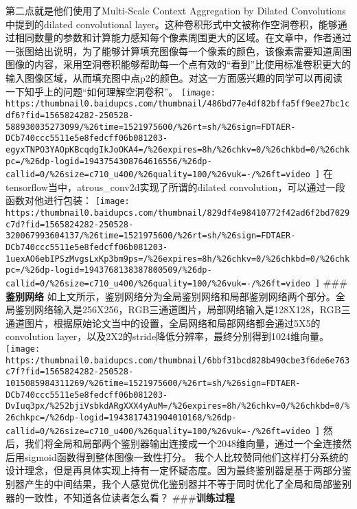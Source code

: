 \documentclass{article}
\begin{document}
第二点就是他们使用了Multi-Scale Context Aggregation by Dilated Convolutions中提到的dilated convolutional layer。这种卷积形式中文被称作空洞卷积，能够通过相同数量的参数和计算能力感知每个像素周围更大的区域。在文章中，作者通过一张图给出说明，为了能够计算填充图像每一个像素的颜色，该像素需要知道周围图像的内容，采用空洞卷积能够帮助每一个点有效的“看到”比使用标准卷积更大的输入图像区域，从而填充图中点p2的颜色。对这一方面感兴趣的同学可以再阅读一下知乎上的问题“如何理解空洞卷积”。
\texttt{[image: https:/thumbnail0.baidupcs.com/thumbnail/486bd77e4df82bffa5ff9ee27bc1cdf6?fid=1565824282-250528-588930035273099/\%26time=1521975600/\%26rt=sh/\%26sign=FDTAER-DCb740ccc5511e5e8fedcff06b081203-egyxTNPO3YAOpKBcqdgIkJoOKA4=/\%26expires=8h/\%26chkv=0/\%26chkbd=0/\%26chkpc=/\%26dp-logid=1943754308764616556/\%26dp-callid=0/\%26size=c710\_u400/\%26quality=100/\%26vuk=-/\%26ft=video
]}{}
在tensorflow当中，atrous\_conv2d实现了所谓的dilated convolution，可以通过一段函数对他进行包装：
\texttt{[image: https:/thumbnail0.baidupcs.com/thumbnail/829df4e98410772f42ad6f2bd7029c7d?fid=1565824282-250528-320067993604137/\%26time=1521975600/\%26rt=sh/\%26sign=FDTAER-DCb740ccc5511e5e8fedcff06b081203-1uexAO6ebIPSzMvgsLxKp3bm9ps=/\%26expires=8h/\%26chkv=0/\%26chkbd=0/\%26chkpc=/\%26dp-logid=1943768138387800509/\%26dp-callid=0/\%26size=c710\_u400/\%26quality=100/\%26vuk=-/\%26ft=video
]}{}
\#\#\#\textbf{鉴别网络}
如上文所示，鉴别网络分为全局鉴别网络和局部鉴别网络两个部分。全局鉴别网络输入是256X256，RGB三通道图片，局部网络输入是128X128，RGB三通道图片，根据原始论文当中的设置，全局网络和局部网络都会通过5X5的convolution layer，以及2X2的stride降低分辨率，最终分别得到1024维向量。
\texttt{[image: https:/thumbnail0.baidupcs.com/thumbnail/6bbf31bcd828b490cbe3f6de6e763c7f?fid=1565824282-250528-1015085984311269/\%26time=1521975600/\%26rt=sh/\%26sign=FDTAER-DCb740ccc5511e5e8fedcff06b081203-DvIuq3px/\%252bjiVsbkdARgXXX4yAuM=/\%26expires=8h/\%26chkv=0/\%26chkbd=0/\%26chkpc=/\%26dp-logid=1943817431904010168/\%26dp-callid=0/\%26size=c710\_u400/\%26quality=100/\%26vuk=-/\%26ft=video
]}{}
然后，我们将全局和局部两个鉴别器输出连接成一个2048维向量，通过一个全连接然后用sigmoid函数得到整体图像一致性打分。
我个人比较赞同他们这样打分系统的设计理念，但是再具体实现上持有一定怀疑态度。因为最终鉴别器是基于两部分鉴别器产生的中间结果，我个人感觉优化鉴别器并不等于同时优化了全局和局部鉴别器的一致性，不知道各位读者怎么看？
\#\#\#\textbf{训练过程}
\end{document}
